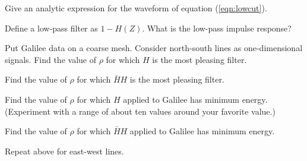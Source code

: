 \begin{exer}
\item
        Give an analytic expression for
        the waveform of equation (\ref{eqn:lowcut}).
\item
        Define a low-pass filter as $1-H(Z)$.
        What is the low-pass impulse response?
\item
        Put Galilee data on a coarse mesh.
        Consider north-south lines as one-dimensional signals.
        Find the value of $\rho$ for which $H$ is the most pleasing filter.
\item
        Find the value of $\rho$ for which $\bar HH$ is the most pleasing filter.
\item
        Find the value of $\rho$ for which $H$ applied to Galilee has minimum energy.
        (Experiment with a range of about ten values around your favorite value.)
\item
        Find the value of $\rho$ for which $\bar HH$ applied to Galilee has minimum energy.
\item
        Repeat above for east-west lines.
\end{exer}



